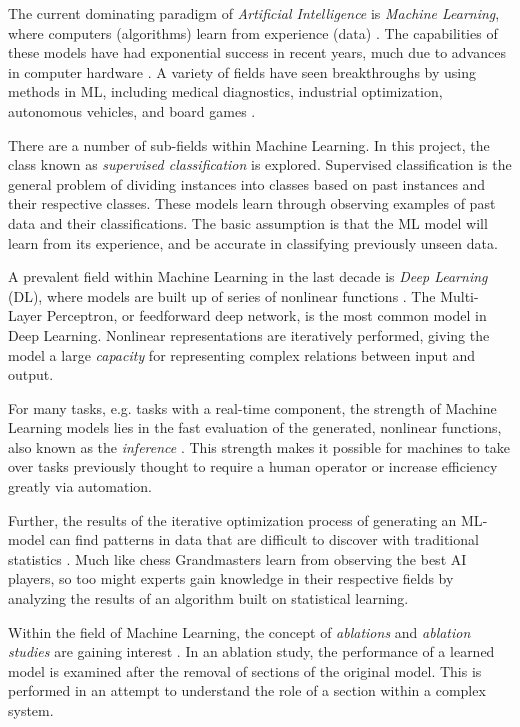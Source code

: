 The current dominating paradigm of \textit{Artificial Intelligence} is \textit{Machine Learning}, where computers (algorithms) learn from experience (data) \cite{goodfellow2016deep}. The capabilities of these models have had exponential success in recent years, much due to advances in computer hardware \cite{goodfellow2016deep}. A variety of fields have seen breakthroughs by using methods in \gls{ML}, including medical diagnostics, industrial optimization, autonomous vehicles, and board games \cite{goodfellow2016deep}. 

There are a number of sub-fields within Machine Learning. In this project, the class known as \textit{supervised classification} is explored. Supervised classification is the general problem of dividing instances into classes based on past instances and their respective classes. These models learn through observing examples of past data and their classifications. The basic assumption is that the \gls{ML} model will learn from its experience, and be accurate in classifying previously unseen data. 

A prevalent field within Machine Learning in the last decade is \textit{Deep Learning} (DL), where models are built up of series of nonlinear functions \cite{goodfellow2016deep}. 
The Multi-Layer Perceptron, or feedforward deep network, is the most common model in Deep Learning. Nonlinear representations are iteratively performed, giving the model a large \textit{capacity} for representing complex relations between input and output. 

For many tasks, e.g. tasks with a real-time component, the strength of Machine Learning models lies in the fast evaluation of the generated, nonlinear functions, also known as the \textit{inference} \cite{bertsimas2019online}. This strength makes it possible for machines to take over tasks previously thought to require a human operator or increase efficiency greatly via automation.

Further, the results of the iterative optimization process of generating an \gls{ML}-model can find patterns in data that are difficult to discover with traditional statistics \cite{goodfellow2016deep}. Much like chess Grandmasters learn from observing the best \gls{AI} players, so too might experts gain knowledge in their respective fields by analyzing the results of an algorithm built on statistical learning.  

Within the field of Machine Learning, the concept of \textit{ablations} and \textit{ablation studies} are gaining interest \cite{meyes2019ablation}. In an ablation study, the performance of a learned model is examined after the removal of sections of the original model. This is performed in an attempt to understand the role of a section within a complex system.  


